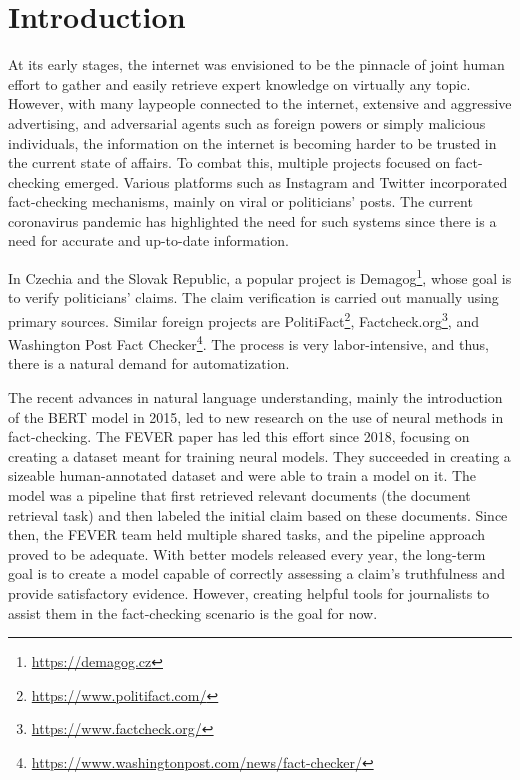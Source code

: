 \chapter*{Introduction}

At its early stages, the internet was envisioned to be the pinnacle of joint human effort to gather and easily retrieve expert knowledge on virtually any topic.
However, with many laypeople connected to the internet, extensive and aggressive advertising, and adversarial agents such as foreign powers or simply malicious individuals, the information on the internet is becoming harder to be trusted in the current state of affairs.
To combat this, multiple projects focused on fact-checking emerged. 
Various platforms such as Instagram and Twitter incorporated fact-checking mechanisms, mainly on viral or politicians' posts.
The current coronavirus pandemic has highlighted the need for such systems since there is a need for accurate and up-to-date information. 

In Czechia and the Slovak Republic, a popular project is Demagog\footnote{\url{https://demagog.cz}}, whose goal is to verify politicians' claims.
The claim verification is carried out manually using primary sources. 
Similar foreign projects are PolitiFact\footnote{\url{https://www.politifact.com/}}, Factcheck.org\footnote{\url{https://www.factcheck.org/}}, and Washington Post Fact Checker\footnote{\url{https://www.washingtonpost.com/news/fact-checker/}}.
The process is very labor-intensive, and thus, there is a natural demand for automatization.

The recent advances in natural language understanding, mainly the introduction of the BERT model \citep{bert} in 2015, led to new research on the use of neural methods in fact-checking.
The FEVER paper \citep{fever} has led this effort since 2018, focusing on creating a dataset meant for training neural models.
They succeeded in creating a sizeable human-annotated dataset and were able to train a model on it.
The model was a pipeline that first retrieved relevant documents (the document retrieval task) and then labeled the initial claim based on these documents. 
Since then, the FEVER team held multiple shared tasks, and the pipeline approach proved to be adequate.
With better models released every year, the long-term goal is to create a model capable of correctly assessing a claim's truthfulness and provide satisfactory evidence. However, creating helpful tools for journalists to assist them in the fact-checking scenario is the goal for now.

